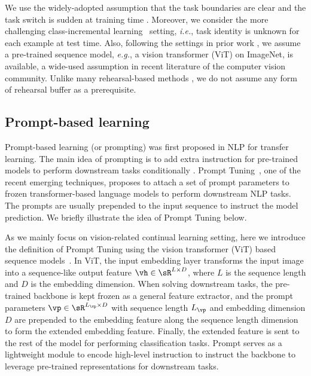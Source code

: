 \documentclass[runningheads]{llncs}
\newcommand{\zizhaoz}[1]{\textcolor{green}{Zizhao: #1}}
\newcommand{\ie}{\emph{i.e.}\xspace}
\newcommand{\eg}{\emph{e.g.}\xspace}
\begin{document}
We use the widely-adopted assumption that the task boundaries are clear and the task switch is sudden at training time \cite{chaudhry2018efficient,pham2021dualnet}. Moreover, we consider the more challenging class-incremental learning~\cite{chaudhry2018efficient} setting, \ie, task identity is unknown for each example at test time. Also, following the settings in prior work \cite{wang2021learning}, we assume a pre-trained sequence model, \eg, a vision transformer (ViT) \cite{vit} on ImageNet, is available, a wide-used assumption in recent literature of the computer vision community. 
Unlike many rehearsal-based methods \cite{chaudhry2019tiny,buzzega2020dark}, we do not assume any form of rehearsal buffer as a prerequisite.

\subsection{Prompt-based learning} \label{sec:prompt}
Prompt-based learning (or prompting) was first proposed in NLP for transfer learning.
The main idea of prompting is to add extra instruction for pre-trained models to perform downstream tasks conditionally \cite{liu2021pre}. Prompt Tuning~\cite{lester2021power}, one of the recent emerging techniques, proposes to attach a set of prompt parameters to frozen transformer-based language models \cite{raffel2020exploring} to perform downstream NLP tasks. The prompts are usually prepended to the input sequence to instruct the model prediction. We briefly illustrate the idea of Prompt Tuning below.

As we mainly focus on vision-related continual learning setting, here we introduce the definition of Prompt Tuning using the vision transformer (ViT) based sequence models~\cite{dosovitskiy2020image,vaswani2017attention}. 
In ViT, the input embedding layer transforms the input image into a sequence-like output feature $\vh \in \sR ^{L \times D}$, where $L$ is the sequence length and $D$ is the embedding dimension. When solving downstream tasks, the pre-trained backbone is kept frozen as a general feature extractor, and the prompt parameters $\vp \in \sR ^{L_{\vp} \times D}$ with sequence length $L_{\vp}$ and embedding dimension $D$ are prepended to the embedding feature along the sequence length dimension to form the extended embedding feature. Finally, the extended feature is sent to the rest of the model for performing classification tasks. Prompt serves as a lightweight module to encode high-level instruction to instruct the backbone to leverage pre-trained representations for downstream tasks.
\end{document}
